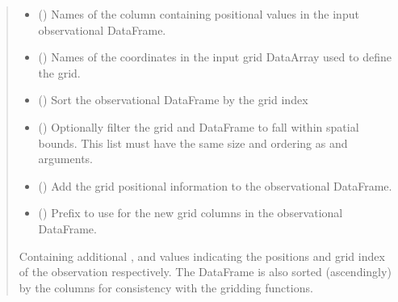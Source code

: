 \documentclass[letterpaper,10pt,english]{sphinxmanual}
\begin{document}
\begin{fulllineitems}
\begin{quote}
\begin{description}
\begin{itemize}
\item {}
\sphinxAtStartPar
{} () \textendash{} Names of the column containing positional values in the input
observational DataFrame.

\item {}
\sphinxAtStartPar
{} () \textendash{} Names of the coordinates in the input grid DataArray used to define the
grid.

\item {}
\sphinxAtStartPar
{} () \textendash{} Sort the observational DataFrame by the grid index

\item {}
\sphinxAtStartPar
{} () \textendash{} Optionally filter the grid and DataFrame to fall within spatial bounds.
This list must have the same size and ordering as  and
 arguments.

\item {}
\sphinxAtStartPar
{} () \textendash{} Add the grid positional information to the observational DataFrame.

\item {}
\sphinxAtStartPar
{} () \textendash{} Prefix to use for the new grid columns in the observational DataFrame.

\end{itemize}

\sphinxAtStartPar
{} \textendash{} Containing additional , and  values
indicating the positions and grid index of the observation
respectively. The DataFrame is also sorted (ascendingly) by the
 columns for consistency with the gridding functions.


\end{description}
\end{quote}
\end{fulllineitems}
\end{document}
